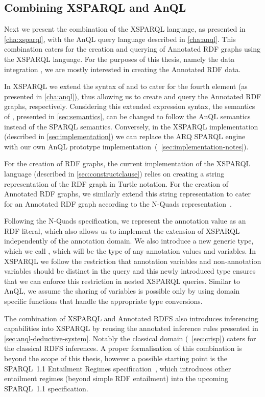 \subsection{Combining XSPARQL and AnQL}
\label{sec:comb-xsparql-anql}


Next we present the combination of the XSPARQL language, as presented in \cref{cha:xsparql}, with the AnQL query
language described in \cref{cha:anql}.
%
This combination caters for the creation and querying of Annotated RDF graphs using the XSPARQL language.  For the
purposes of this thesis, namely the data integration \usecase, we are mostly interested in creating the Annotated RDF
data.

In XSPARQL we extend the syntax of  and  to cater for the fourth element (as
presented in \cref{cha:anql}), thus allowing us to create and query the Annotated RDF graphs, respectively.
%
Considering this extended expression syntax, the semantics of , presented in \cref{sec:semantics},
can be changed to follow the AnQL semantics instead of the SPARQL semantics.  Conversely, in the XSPARQL implementation
(described in \cref{sec:implementation}) we can replace the ARQ SPARQL engine with our own AnQL prototype
implementation~(\cf~\cref{sec:implementation-notes}).
%

For the creation of \ac{RDF} graphs, the current implementation of the XSPARQL language (described in
\cref{sec:constructclause}) relies on creating a string representation of the \ac{RDF} graph in Turtle notation.
%
For the creation of Annotated RDF graphs, we similarly extend this string representation to cater for an Annotated
\ac{RDF} graph according to the N-Quads representation~\cite{CyganiakHarthHogan:2009aa}.
 
Following the N-Quads specification, we represent the annotation value as an \ac{RDF} literal, which also allows us to
implement the extension of XSPARQL independently of the annotation domain.
%
We also introduce a new generic type, which we call , which will be the type of any annotation
values and variables.  
%
In XSPARQL we follow the restriction that annotation variables and non-annotation variables should be distinct in the
query and this newly introduced type ensures that we can enforce this restriction in nested XSPARQL queries.
% 
Similar to AnQL, we assume the sharing of variables is possible only by using domain specific functions that handle
the appropriate type conversions.

The combination of XSPARQL and Annotated \ac{RDFS} also introduces inferencing capabilities into XSPARQL by reusing the
annotated inference rules presented in \cref{sec:anql-deductive-system}.  Notably the classical domain
(\cf~\cref{sec:crisp}) caters for the classical \ac{RDFS} inferences.
%
A proper formalisation of this combination is beyond the scope of this thesis, however a possible starting point is the
SPARQL~1.1 Entailment Regimes specification~\cite{GlimmOgbuji:2012aa}, which introduces other entailment regimes (beyond
simple \ac{RDF} entailment) into the upcoming SPARQL~1.1 specification.
%




